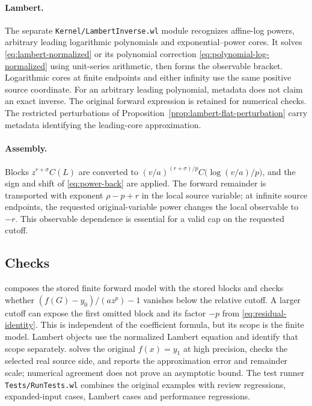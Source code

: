 \paragraph{Lambert.} The separate \texttt{Kernel/LambertInverse.wl} module recognizes affine-log powers, arbitrary leading logarithmic polynomials and exponential--power cores. It solves \eqref{eq:lambert-normalized} or its polynomial correction \eqref{eq:polynomial-log-normalized} using unit-series arithmetic, then forms the observable bracket. Logarithmic cores at finite endpoints and either infinity use the same positive source coordinate. For an arbitrary leading polynomial, metadata does not claim an exact  inverse. The original forward expression is retained for numerical checks. The restricted perturbations of Proposition~\ref{prop:lambert-flat-perturbation} carry metadata identifying the leading-core approximation.

\paragraph{Assembly.} Blocks $z^{r+\sigma}C(L)$ are converted to $(v/a)^{(r+\sigma)/p}C\bigl(\log(v/a)/p\bigr)$, and the sign and shift of \eqref{eq:power-back} are applied. The forward remainder is transported with exponent $\rho-p+r$ in the local source variable; at infinite source endpoints, the requested original-variable power changes the local observable to $-r$. This observable dependence is essential for a valid cap on the requested cutoff.

\subsection{Checks}

 composes the stored finite forward model with the stored blocks and checks whether $(f(G)-y_0)/(az^p)-1$ vanishes below the relative cutoff. A larger cutoff can expose the first omitted block and its factor $-p$ from \eqref{eq:residual-identity}. This is independent of the coefficient formula, but its scope is the finite model. Lambert objects use the normalized Lambert equation and identify that scope separately.  solves the original $f(x)=y_1$ at high precision, checks the selected real source side, and reports the approximation error and remainder scale; numerical agreement does not prove an asymptotic bound. The test runner \texttt{Tests/RunTests.wl} combines the original examples with review regressions, expanded-input cases, Lambert cases and performance regressions.

